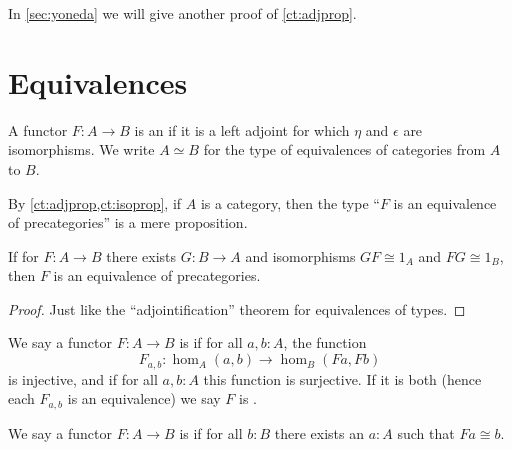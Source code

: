 In \autoref{sec:yoneda} we will give another proof of \autoref{ct:adjprop}.


\section{Equivalences}
\label{sec:equivalences}

\begin{defn}
  A functor $F:A\to B$ is an  if it is a left adjoint for which $\eta$ and $\epsilon$ are isomorphisms.
  We write $A\simeq B$ for the type of equivalences of categories from $A$ to $B$.
\end{defn}

By \autoref{ct:adjprop,ct:isoprop}, if $A$ is a category, then the type ``$F$ is an equivalence of precategories'' is a mere proposition.

\begin{lem}\label{ct:adjointification}
  If for $F:A\to B$ there exists $G:B\to A$ and isomorphisms $GF\cong 1_A$ and $FG\cong 1_B$, then $F$ is an equivalence of precategories.
\end{lem}
\begin{proof}
  Just like the ``adjointification'' theorem for equivalences of types.
\end{proof}

\begin{defn}
  We say a functor $F:A\to B$ is  if for all $a,b:A$, the function
  \[F_{a,b}:\hom_A(a,b) \to \hom_B(Fa,Fb)\]
  is injective, and  if for all $a,b:A$ this function is surjective.
  If it is both (hence each $F_{a,b}$ is an equivalence) we say $F$ is .
\end{defn}

\begin{defn}
  We say a functor $F:A\to B$ is  if for all $b:B$ there exists an $a:A$ such that $Fa\cong b$.
\end{defn}

